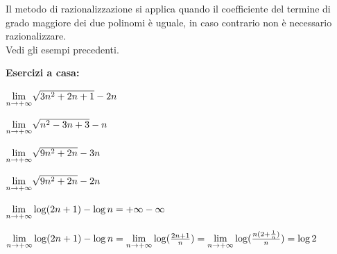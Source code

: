 \documentclass[12pt]{report}
\newcounter{exercise}
\begin{document}
	\begin{note}{}{}
		Il metodo di razionalizzazione si applica quando il coefficiente del termine di grado maggiore dei due polinomi è uguale, in caso contrario non è necessario razionalizzare. \\
		Vedi gli esempi precedenti.
	\end{note}
	\textbf{Esercizi a casa:}
	\begin{assignment}{}{}
		$\mathlarger{\lim_{n \to +\infty}}\sqrt{3n^2+2n+1}-2n$
	\end{assignment}
	\begin{assignment}{}{}
		$\mathlarger{\lim_{n \to +\infty}}\sqrt{n^2-3n+3}-n$
	\end{assignment}
	\begin{assignment}{}{}
		$\mathlarger{\lim_{n \to +\infty}}\sqrt{9n^2+2n}-3n$
	\end{assignment}

	\begin{assignment}{}{}
		$\mathlarger{\lim_{n \to +\infty}}\sqrt{9n^2+2n}-2n$
	\end{assignment}
	\begin{assignment}{}{}
		$\mathlarger{\lim_{n \to +\infty}}\log(2n+1)-\log n = +\infty - \infty$
		\begin{exercise}{}{}
			$\mathlarger{\lim_{n \to +\infty}}\log(2n+1)-\log n = \mathlarger{\lim_{n \to +\infty}}\log(\frac{2n + 1}{n})=\mathlarger{\lim_{n \to +\infty}}\log(\frac{n(2 + \frac{1}{n})}{n}) = \log 2$
		\end{exercise}
	\end{assignment}
\end{document}

